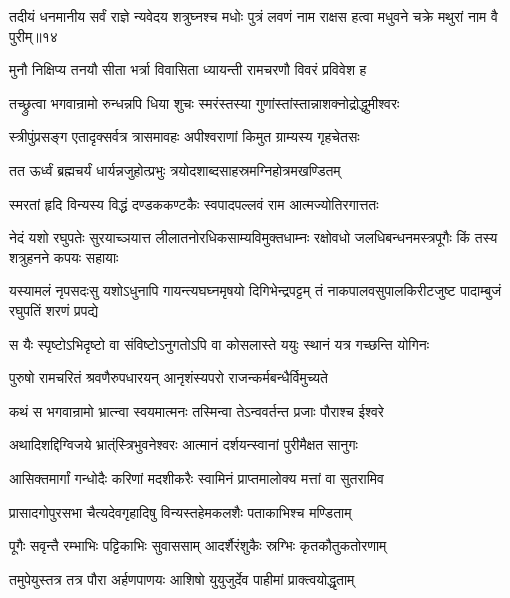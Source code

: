 \threelineshloka
{तदीयं धनमानीय सर्वं राज्ञे न्यवेदय}
{शत्रुघ्नश्च मधोः पुत्रं लवणं नाम राक्षस}
{हत्वा मधुवने चक्रे मथुरां नाम वै पुरीम्॥१४} %

\twolineshloka
{मुनौ निक्षिप्य तनयौ सीता भर्त्रा विवासिता}
{ध्यायन्ती रामचरणौ विवरं प्रविवेश ह} %

\twolineshloka
{तच्छ्रुत्वा भगवान्रामो रुन्धन्नपि धिया शुचः}
{स्मरंस्तस्या गुणांस्तांस्तान्नाशक्नोद्रोद्धुमीश्वरः} %

\twolineshloka
{स्त्रीपुंप्रसङ्ग एतादृक्सर्वत्र त्रासमावहः}
{अपीश्वराणां किमुत ग्राम्यस्य गृहचेतसः} %

\twolineshloka
{तत ऊर्ध्वं ब्रह्मचर्यं धार्यन्नजुहोत्प्रभुः}
{त्रयोदशाब्दसाहस्रमग्निहोत्रमखण्डितम्} %

\twolineshloka
{स्मरतां हृदि विन्यस्य विद्धं दण्डककण्टकैः}
{स्वपादपल्लवं राम आत्मज्योतिरगात्ततः} %

\fourlineindentedshloka
{नेदं यशो रघुपतेः सुरयाच्ञयात्त}
{लीलातनोरधिकसाम्यविमुक्तधाम्नः}
{रक्षोवधो जलधिबन्धनमस्त्रपूगैः}
{किं तस्य शत्रुहनने कपयः सहायाः} %

\fourlineindentedshloka
{यस्यामलं नृपसदःसु यशोऽधुनापि}
{गायन्त्यघघ्नमृषयो दिगिभेन्द्रपट्टम्}
{तं नाकपालवसुपालकिरीटजुष्ट}
{पादाम्बुजं रघुपतिं शरणं प्रपद्ये} %

\twolineshloka
{स यैः स्पृष्टोऽभिदृष्टो वा संविष्टोऽनुगतोऽपि वा}
{कोसलास्ते ययुः स्थानं यत्र गच्छन्ति योगिनः} %

\twolineshloka
{पुरुषो रामचरितं श्रवणैरुपधारयन्}
{आनृशंस्यपरो राजन्कर्मबन्धैर्विमुच्यते} %



\twolineshloka
{कथं स भगवान्रामो भ्रात्न्वा स्वयमात्मनः}
{तस्मिन्वा तेऽन्ववर्तन्त प्रजाः पौराश्च ईश्वरे} %



\twolineshloka
{अथादिशद्दिग्विजये भ्रात्ंस्त्रिभुवनेश्वरः}
{आत्मानं दर्शयन्स्वानां पुरीमैक्षत सानुगः} %

\twolineshloka
{आसिक्तमार्गां गन्धोदैः करिणां मदशीकरैः}
{स्वामिनं प्राप्तमालोक्य मत्तां वा सुतरामिव} %

\twolineshloka
{प्रासादगोपुरसभा चैत्यदेवगृहादिषु}
{विन्यस्तहेमकलशैः पताकाभिश्च मण्डिताम्} %

\twolineshloka
{पूगैः सवृन्तै रम्भाभिः पट्टिकाभिः सुवाससाम्}
{आदर्शैरंशुकैः स्रग्भिः कृतकौतुकतोरणाम्} %

\twolineshloka
{तमुपेयुस्तत्र तत्र पौरा अर्हणपाणयः}
{आशिषो युयुजुर्देव पाहीमां प्राक्त्वयोद्धृताम्} %


